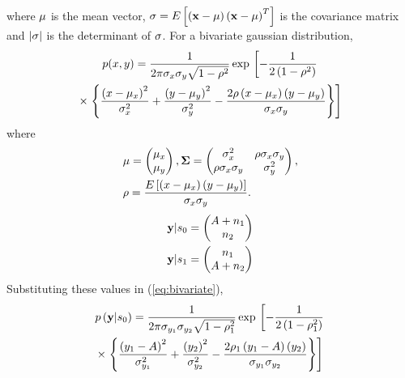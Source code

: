 \documentclass[10pt, a4paper]{article}
\providecommand{\sbrak}[1]{\ensuremath{{}\left[#1\right]}}
\providecommand{\brak}[1]{\ensuremath{\left(#1\right)}}
\begin{document}
\begin{enumerate}
\begin{multline}
    \end{multline}
    where $\mathbf{\mu}$ is the mean vector, $\mbf{\sigma} = E\sbrak{\brak{\mathbf{x}-\mbf{\mu}}\brak{\mathbf{x}-\mbf{\mu}}^T}$ is the covariance matrix and $\vert\mathbf{\sigma}\vert$ is the determinant of $\mathbf{\sigma}$.
    For a bivariate gaussian distribution,
    {\small
    \begin{multline}
    \label{eq:bivariate}
    p(x,y)= \frac{1}{2\pi \sigma_x\sigma_y\sqrt{1-\rho^2}}\exp\lsbrak{-\frac{1}{2\brak{1-\rho^2}}}
    \\
    \times \rsbrak{\cbrak{\frac{\brak{x-\mu_x}^2}{\sigma_x^2}+\frac{\brak{y-\mu_y}^2}{\sigma_y^2}-\frac{2\rho\brak{x-\mu_x}\brak{y-\mu_y}}{\sigma_x\sigma_y}}}
    \end{multline}
    }
    where
    \begin{align}
    &\mbf{\mu}=
    \begin{pmatrix}
    \mu_x \\
    \mu_y
    \end{pmatrix},
    \mbf{\Sigma} = 
    \begin{pmatrix}%
    \sigma_x^2 & \rho\sigma_x\sigma_y \\
    \rho\sigma_x\sigma_y & \sigma_y^2
    \end{pmatrix},\\
    &\rho = \frac{E\sbrak{\brak{x - \mu_x}\brak{y-\mu_y}}}{\sigma_x\sigma_y}.
    \end{align}
    \begin{align}
        \mathbf{y}|s_0 &= 
        \begin{pmatrix}
        A+n_1 \\
        n_2
        \end{pmatrix}\\
        \mathbf{y}|s_1 &=  
        \begin{pmatrix}
        n_1 \\
        A+n_2
        \end{pmatrix}
        \end{align}
        Substituting these values in (\ref{eq:bivariate}),
        \begin{multline}
        \label{gauss_mutl_var1}
        p\brak{\mbf{y}|s_0} = \frac{1}{2\pi\sigma_{y_1}\sigma_{y_2}\sqrt{1-\rho_1^2}}\exp\lsbrak{-\frac{1}{2\brak{1-\rho_1^2}}}
        \\
        \times \rsbrak{\cbrak{\frac{\brak{y_1-A}^2}{\sigma_{y_1}^2}+\frac{\brak{y_2}^2}{\sigma_{y_2}^2}-\frac{2\rho_1\brak{y_1-A}\brak{y_2}}{\sigma_{y_1}\sigma_{y_2}}}}

\end{multline}
\end{enumerate}
\end{document}

